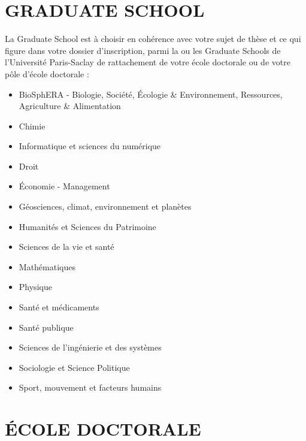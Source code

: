 \documentclass[french,12pt,a4paper]{book}
\begin{document}
\section{GRADUATE SCHOOL}
La Graduate School est à choisir en cohérence avec votre sujet de thèse et ce qui figure dans votre dossier d’inscription, parmi la ou les Graduate Schools de l’Université Paris-Saclay de rattachement de votre école doctorale ou de votre pôle d’école doctorale :

\begin{itemize}
	\renewcommand{\labelitemi}{$\bullet$}
	\item BioSphERA - Biologie, Société, Écologie \& Environnement, Ressources, Agriculture \& Alimentation
	\item Chimie
	\item Informatique et sciences du numérique
	\item Droit
	\item Économie - Management
	\item Géosciences, climat, environnement et planètes
	\item Humanités et Sciences du Patrimoine
	\item Sciences de la vie et santé
	\item Mathématiques
	\item Physique
	\item Santé et médicaments
	\item Santé publique
	\item Sciences de l’ingénierie et des systèmes
	\item Sociologie et Science Politique
	\item Sport, mouvement et facteurs humains
\end{itemize}

\section{ÉCOLE DOCTORALE}
\end{document}
